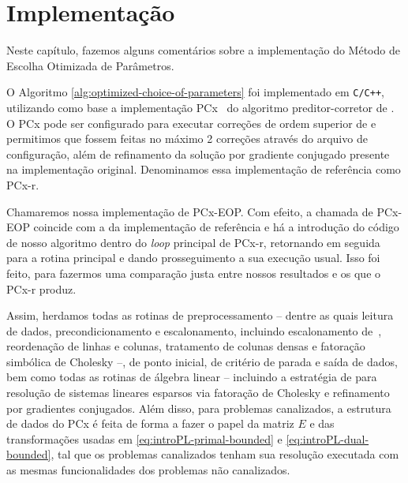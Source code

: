 

\chapter{Implementação}
\label{chap:implementa}
Neste capítulo, fazemos alguns comentários sobre a implementação do Método de Escolha Otimizada de Parâmetros. 


O Algoritmo \ref{alg:optimized-choice-of-parameters} foi implementado em  \texttt{C/C++}, utilizando como base a implementação PCx~\cite{Czyzyk:1999hk} do algoritmo preditor-corretor de \textcite{Mehrotra:1992wr}. O PCx pode ser configurado para executar correções de ordem superior de \textcite{Gondzio:1996uw} e permitimos que fossem feitas no máximo 2 correções através do arquivo de configuração, além de  refinamento da solução por gradiente conjugado presente na implementação original. Denominamos essa implementação de referência como PCx-r.

  Chamaremos nossa implementação de PCx-EOP. Com efeito, a chamada de PCx-EOP coincide com a da implementação de referência e há a introdução do código de nosso algoritmo dentro do \emph{loop} principal de PCx-r,  retornando em seguida para a rotina principal e dando prosseguimento a sua execução usual. Isso foi feito, para fazermos uma comparação justa entre nossos resultados e os que o PCx-r produz. 

  Assim, herdamos todas as rotinas de preprocessamento -- dentre as quais leitura de dados, precondicionamento e escalonamento, incluindo escalonamento de~\textcite{Curtis:1972cp}, reordenação de linhas e colunas, tratamento de colunas densas e fatoração simbólica de Cholesky --, de ponto inicial, de critério de parada e saída de dados,   bem como todas as rotinas de álgebra linear -- incluindo a estratégia  de \textcite{Ng:1993uz} para resolução de sistemas lineares esparsos via fatoração de Cholesky  e refinamento por gradientes conjugados. Além disso, para problemas canalizados, a estrutura de dados do PCx é feita de forma a fazer o papel da matriz $E$ e das transformações usadas em \eqref{eq:introPL-primal-bounded} e \eqref{eq:introPL-dual-bounded}, tal que os problemas canalizados tenham sua resolução executada com  as mesmas funcionalidades dos problemas não canalizados. 



